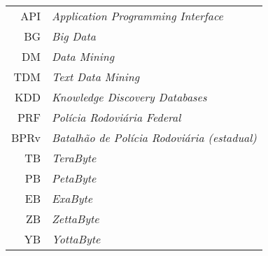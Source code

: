 \vspace*{12pt}

\noindent

\vspace{1em}

\begin{tabular}{r  l}
 API & \textit{Application Programming Interface}\\
 BG & \textit{Big Data}\\
 DM & \textit{Data Mining}\\
 TDM & \textit{Text Data Mining}\\
 KDD & \textit{Knowledge Discovery Databases}\\
 PRF & \textit{Polícia Rodoviária Federal}\\
 BPRv & \textit{Batalhão de Polícia Rodoviária (estadual)}\\ 
 TB & \textit{TeraByte}\\
 PB & \textit{PetaByte}\\
 EB & \textit{ExaByte}\\
 ZB & \textit{ZettaByte}\\
 YB & \textit{YottaByte}\\
 
\end{tabular}



